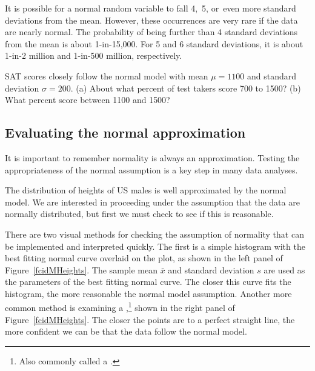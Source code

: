 It is possible for a normal random variable to fall 4,~5, or~even more standard deviations from the mean. However, these occurrences are very rare if the data are nearly normal. The probability of being further than 4 standard deviations from the mean is about 1-in-15,000. For 5 and 6 standard deviations, it is about 1-in-2 million and 1-in-500 million, respectively.

\begin{exercisewrap}
\begin{nexercise}
SAT scores closely follow the normal model with mean $\mu = 1100$ and standard deviation $\sigma = 200$. (a) About what percent of test takers score 700 to 1500? (b) What percent score between 1100 and 1500?\footnotemark
\end{nexercise}
\end{exercisewrap}

\subsection{Evaluating the normal approximation}
\label{assessingNormal}

It is important to remember normality is always an approximation. Testing the appropriateness of the normal assumption is a key step in many data analyses.


The distribution of heights of US males is well approximated by the normal model. We are interested in proceeding under the assumption that the data are normally distributed, but first we must check to see if this is reasonable.

There are two visual methods for checking the assumption of normality that can be implemented and interpreted quickly. The first is a simple histogram with the best fitting normal curve overlaid on the plot, as shown in the left panel of Figure~\ref{fcidMHeights}. The sample mean $\bar{x}$ and standard deviation $s$ are used as the parameters of the best fitting normal curve. The closer this curve fits the histogram, the more reasonable the normal model assumption. Another more common method is examining a ,\footnote{Also commonly called a .} shown in the right panel of Figure~\ref{fcidMHeights}. The closer the points are to a perfect straight line, the more confident we can be that the data follow the normal model.

